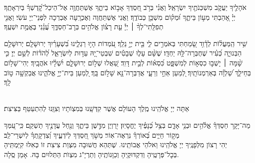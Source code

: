 אֹהָלֶ֖יךָ יַעֲקֹ֑ב מִשְׁכְּנֹתֶ֖יךָ יִשְׂרָאֵֽל׃
וַאֲנִ֗י
בְּרֹ֣ב חַ֭סְדְּךָ אָב֣וֹא בֵיתֶ֑ךָ אֶשְׁתַּחֲוֶ֥ה אֶל־הֵיכַל־קׇ֝דְשְׁךָ֗ בְּיִרְאָתֶֽךָ׃\\
יְיָ֗ אָ֭הַבְתִּי מְע֣וֹן בֵּיתֶ֑ךָ וּ֝מְק֗וֹם מִשְׁכַּ֥ן כְּבוֹדֶֽךָ׃
וַאֲנִי אֶשְׁתַּחֲוֶה וְאֶכְרָֽעָה אֶבְרְכָה לִפְנֵי־יְיָ עֹשִׂי׃
וַאֲנִ֤י
%
תְפִלָּֽתִי־לְךָ֨ ׀ יְיָ֡ עֵ֤ת רָצ֗וֹן אֱלֹהִ֥ים בְּרׇב־חַסְדֶּ֑ךָ עֲ֝נֵ֗נִי בֶּאֱמֶ֥ת יִשְׁעֶֽךָ׃

{\footnotesize 
שִׁ֥יר הַֽמַּעֲל֗וֹת לְדָ֫וִ֥ד שָׂ֭מַחְתִּי בְּאֹמְרִ֣ים לִ֑י בֵּ֖ית יְיָ֣ נֵלֵֽךְ׃ עֹ֭מְדוֹת הָי֣וּ רַגְלֵ֑ינוּ בִּ֝שְׁעָרַ֗יִךְ יְרוּשָׁלָֽ͏ִם׃ יְרוּשָׁלַ֥͏ִם הַבְּנוּיָ֑ה כְּ֝עִ֗יר שֶׁחֻבְּרָה־לָּ֥הּ יַחְדָּֽו׃ שֶׁשָּׁ֨ם עָל֪וּ שְׁבָטִ֡ים שִׁבְטֵי־יָ֭הּ עֵד֣וּת לְיִשְׂרָאֵ֑ל לְ֝הֹד֗וֹת לְשֵׁ֣ם יְיָ׃ כִּ֤י שָׁ֨מָּה ׀ יָשְׁב֣וּ כִסְא֣וֹת לְמִשְׁפָּ֑ט כִּ֝סְא֗וֹת לְבֵ֣ית דָּוִֽד׃ שַׁ֭אֲלוּ שְׁל֣וֹם יְרוּשָׁלָ֑͏ִם יִ֝שְׁלָ֗יוּ אֹהֲבָֽיִךְ׃ יְהִי־שָׁל֥וֹם בְּחֵילֵ֑ךְ שַׁ֝לְוָ֗ה בְּאַרְמְנוֹתָֽיִךְ׃ לְ֭מַעַן אַחַ֣י וְרֵעָ֑י אֲדַבְּרָה־נָּ֖א שָׁל֣וֹם בָּֽךְ׃ לְ֭מַעַן בֵּית־יְיָ֣ אֱלֹהֵ֑ינוּ אֲבַקְשָׁ֖ה ט֣וֹב לָֽךְ׃}


\\
אַתָּה יְיָ אֱלֹהֵֽינוּ מֶֽלֶךְ הָעוֹלָם \middot אֲשֶׁר קִדְּשָֽׁנוּ בְּמִצְוֹתָיו וְצִוָּֽנוּ לְהִתְעַטֵּף בַּצִּיצִת׃\\
\begin{footnotesize}
	מַה־יָּקָ֥ר חַסְדְּךָ֗ אֱלֹ֫הִ֥ים וּבְנֵ֥י אָדָ֑ם בְּצֵ֥ל כְּ֝נָפֶ֗יךָ יֶחֱסָיֽוּן׃ יִ֭רְוְיֻן מִדֶּ֣שֶׁן בֵּיתֶ֑ךָ וְנַ֖חַל עֲדָנֶ֣יךָ תַשְׁקֵֽם׃ כִּֽי־עִ֭מְּךָ מְק֣וֹר חַיִּ֑ים בְּ֝אוֹרְךָ֗ נִרְאֶה־אֽוֹר׃ מְשֹׁ֣ךְ חַ֭סְדְּךָ לְיֹדְעֶ֑יךָ וְ֝צִדְקָֽתְךָ֗ לְיִשְׁרֵי־לֵֽב׃\\
	יְהִי רָצוֹן מִלְּפָנֶֽיךָ יְיָ אֱלֹהֵֽינוּ וֵאלֹהֵי אֲבוֹתֵֽינוּ. שֶׁתְּהֵא חֲשׁוּבָה מִצְוַת צִיצִת זוֹ כְּאִלּוּ קִיַּמְתִּֽיהָ בְּכׇל־פְּרָטֶֽיהָ וְדִקְדּוּקֶֽיהָ וְכַוָּנוֹתֶֽיהָ וְתַרְיָ"ג מִצְוֺת הַתְּלוּיִם בָּהּ. אָמֵן סֶֽלָה. 
\end{footnotesize}


